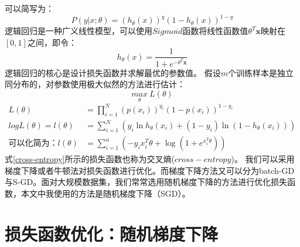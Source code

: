 \documentclass[twoside]{article}
\begin{document}
可以简写为：
\begin{equation*}
    P(y|x;\theta)=(h_{\theta}(x))^y(1-h_{\theta}(x))^{1-y}
\end{equation*}
逻辑回归是一种广义线性模型，可以使用$Sigmoid$函数将线性函数值$\theta^T\boldsymbol{x}$映射在$[0,1]$之间，即令：
\begin{equation*}
    h_{\theta}(x)=\frac{1}{1+e^{-\theta^T \boldsymbol{x}}}
\end{equation*}
逻辑回归的核心是设计损失函数并求解最优的参数值。
假设$m$个训练样本是独立同分布的，对参数使用极大似然的方法进行估计：
$$\underset{\theta}{max}\ L(\theta)$$
\begin{equation}
    \label{cross-entropy}
    \begin{aligned}
        L(\theta)&=\prod_{i=1}^N (p(x_i))^{y_i}(1-p(x_i))^{1-y_i}\\
        log L(\theta)=l(\theta)&=\sum_{i=1}^N(y_i\ln h_{\theta}(x_i)+(1-y_i)\ln (1-h_{\theta}(x_i)))\\
        \text{可以化简为：}l(\theta)&=\sum_{i=1}^n(-y_ix_i^T\theta+\log (1+e^{x_i^T \theta}))
    \end{aligned}
\end{equation}
式\ref{cross-entropy}所示的损失函数也称为交叉熵($cross-entropy$)。
我们可以采用梯度下降或者牛顿法对损失函数进行优化。而梯度下降方法又可以分为batch-GD与S-GD。面对大规模数据集，我们常常选用随机梯度下降的方法进行优化损失函数，本文中我使用的方法是随机梯度下降（SGD）。

\section*{损失函数优化：随机梯度下降}
\end{document}
